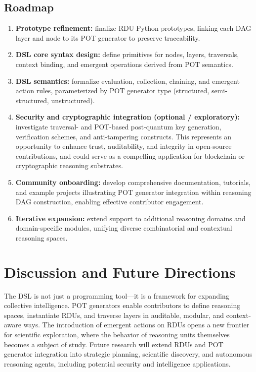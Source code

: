 \documentclass[11pt]{article}
\begin{document}
\subsection{Roadmap}
\begin{enumerate}
    \item \textbf{Prototype refinement:} finalize RDU Python prototypes, linking each DAG layer and node to its POT generator to preserve traceability.
    \item \textbf{DSL core syntax design:} define primitives for nodes, layers, traversals, context binding, and emergent operations derived from POT semantics.
    \item \textbf{DSL semantics:} formalize evaluation, collection, chaining, and emergent action rules, parameterized by POT generator type (structured, semi-structured, unstructured).
    \item \textbf{Security and cryptographic integration (optional / exploratory):} investigate traversal- and POT-based post-quantum key generation, verification schemes, and anti-tampering constructs. This represents an opportunity to enhance trust, auditability, and integrity in open-source contributions, and could serve as a compelling application for blockchain or cryptographic reasoning substrates.
    \item \textbf{Community onboarding:} develop comprehensive documentation, tutorials, and example projects illustrating POT generator integration within reasoning DAG construction, enabling effective contributor engagement.
    \item \textbf{Iterative expansion:} extend support to additional reasoning domains and domain-specific modules, unifying diverse combinatorial and contextual reasoning spaces.
\end{enumerate}

\section{Discussion and Future Directions}
The DSL is not just a programming tool—it is a framework for expanding collective intelligence. POT generators enable contributors to define reasoning spaces, instantiate RDUs, and traverse layers in auditable, modular, and context-aware ways.  
The introduction of emergent actions on RDUs opens a new frontier for scientific exploration, where the behavior of reasoning units themselves becomes a subject of study.  
Future research will extend RDUs and POT generator integration into strategic planning, scientific discovery, and autonomous reasoning agents, including potential security and intelligence applications.
\end{document}
